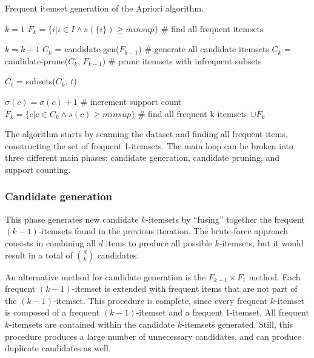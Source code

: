 \begin{algorithm}
\caption{Frequent itemset generation of the Apriori algorithm.}
\begin{algorithmic}[1]
    \State $k = 1$
    \State $F_k = \{ i | i \in I \land s(\{i\}) \geq minsup \}$ \# find all frequent itemsets

    \Repeat
        \State $k = k + 1$
        \State $C_k$ = candidate-gen($F_{k-1}$) \# generate all candidate itemsets
        \State $C_k$ = candidate-prune($C_k$, $F_{k-1}$) \# prune itemsets with infrequent subsets

            \State $C_t$ = subsets($C_k$, $t$)

                \State $\sigma(c) = \sigma(c) + 1$ \# increment support count
            \EndFor
        \EndFor
        \State $F_k = \{ c | c \in C_k \land s(c) \geq minsup \}$ \# find all frequent k-itemsets
    \State \Return $\cup F_k$
\end{algorithmic}
\end{algorithm}

The algorithm starts by scanning the dataset and finding all frequent items, constructing the set of frequent 1-itemsets. The main loop can be broken into three different main phases: candidate generation, candidate pruning, and support counting.

\subsubsection{Candidate generation}

This phase generates new candidate $k$-itemsets by ``fusing'' together the frequent $(k-1)$-itemsets found in the previous iteration. The brute-force approach consists in combining all $d$ items to produce all possible $k$-itemsets, but it would result in a total of $\binom{d}{k}$ candidates.

An alternative method for candidate generation is the $F_{k-1} \times F_1$ method. Each frequent $(k-1)$-itemset is extended with frequent items that are not part of the $(k-1)$-itemset. This procedure is complete, since every frequent $k$-itemset is composed of a frequent $(k-1)$-itemset and a frequent 1-itemset. All frequent $k$-itemsets are contained within the candidate $k$-itemsets generated. Still, this procedure produces a large number of unnecessary candidates, and can produce duplicate candidates as well.

